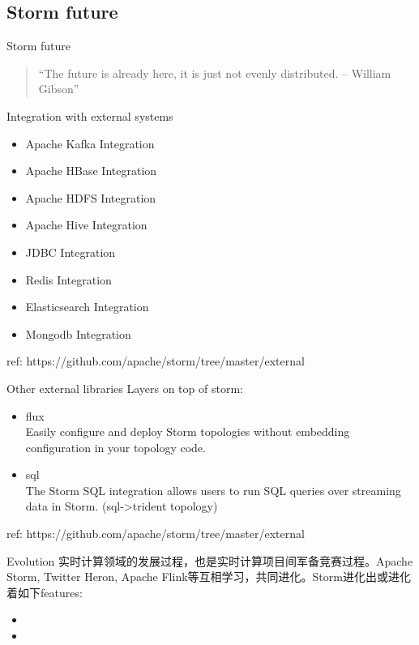 \documentclass{beamer}
\begin{document}
\subsection{Storm future}
\begin{frame}{Storm future}
  \begin{quote}
    ``The future is already here, it is just not evenly distributed. -- William Gibson''
  \end{quote}
\end{frame}

\begin{frame}{Integration with external systems}

  \begin{itemize}
    \item     Apache Kafka Integration
    \item     Apache HBase Integration
    \item     Apache HDFS Integration
    \item     Apache Hive Integration
    \item     JDBC Integration
    \item     Redis Integration
    \item     Elasticsearch Integration
    \item     Mongodb Integration
  \end{itemize}
  ref: https://github.com/apache/storm/tree/master/external
\end{frame}

\begin{frame}{Other external libraries}
  Layers on top of storm:
  \begin{itemize}
    \item flux \\
      Easily configure and deploy Storm topologies without embedding configuration in your topology code.
    \item sql \\
      The Storm SQL integration allows users to run SQL queries over streaming data in Storm. (sql->trident topology)
  \end{itemize}
  ref: https://github.com/apache/storm/tree/master/external
\end{frame}

\begin{frame}{Evolution}
  实时计算领域的发展过程，也是实时计算项目间军备竞赛过程。Apache Storm, Twitter Heron, Apache Flink等互相学习，共同进化。Storm进化出或进化着如下features:
  \begin{itemize}
    \item 
    \item 
  \end{itemize}
\end{frame}
\end{document}
